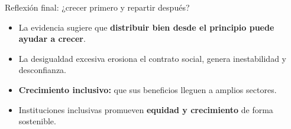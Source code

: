\documentclass{beamer}
\begin{document}
\begin{frame}{Reflexión final: ¿crecer primero y repartir después?}
    \begin{itemize}
        \item La evidencia sugiere que \textbf{distribuir bien desde el principio puede ayudar a crecer}.
        \item La desigualdad excesiva erosiona el contrato social, genera inestabilidad y desconfianza.
        \item \textbf{Crecimiento inclusivo:} que sus beneficios lleguen a amplios sectores.
        \item Instituciones inclusivas promueven \textbf{equidad y crecimiento} de forma sostenible.
    \end{itemize}
\end{frame}
\end{document}
